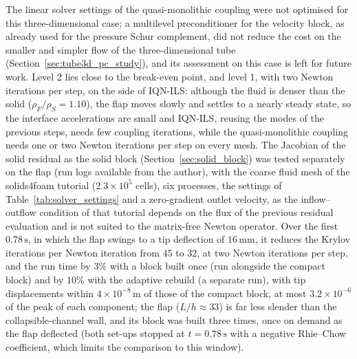 The linear solver settings of the quasi-monolithic coupling were not optimised for this three-dimensional case; a multilevel preconditioner for the velocity block, as already used for the pressure Schur complement, did not reduce the cost on the smaller and simpler flow of the three-dimensional tube (Section~\ref{sec:tube3d_pc_study}), and its assessment on this case is left for future work.
Level 2 lies close to the break-even point, and level 1, with two Newton iterations per step, on the side of IQN-ILS: although the fluid is denser than the solid ($\rho_F/\rho_S = 1.10$), the flap moves slowly and settles to a nearly steady state, so the interface accelerations are small and IQN-ILS, reusing the modes of the previous steps, needs few coupling iterations, while the quasi-monolithic coupling needs one or two Newton iterations per step on every mesh.
The Jacobian of the solid residual as the solid block (Section~\ref{sec:solid_block}) was tested separately on the flap (run logs available from the author), with the coarse fluid mesh of the solids4foam tutorial ($2.3\times10^{5}$ cells), six processes, the settings of Table~\ref{tab:solver_settings} and a zero-gradient outlet velocity, as the inflow--outflow condition of that tutorial depends on the flux of the previous residual evaluation and is not suited to the matrix-free Newton operator.
Over the first $0.78\,\mathrm{s}$, in which the flap swings to a tip deflection of $16\,\mathrm{mm}$, it reduces the Krylov iterations per Newton iteration from 45 to 32, at two Newton iterations per step, and the run time by $3\%$ with a block built once (run alongside the compact block) and by $10\%$ with the adaptive rebuild (a separate run), with tip displacements within $4\times10^{-8}\,\mathrm{m}$ of those of the compact block, at most $3.2\times10^{-6}$ of the peak of each component; the flap ($L/h \approx 33$) is far less slender than the collapsible-channel wall, and its block was built three times, once on demand as the flap deflected (both set-ups stopped at $t = 0.78\,\mathrm{s}$ with a negative Rhie--Chow coefficient, which limits the comparison to this window).
